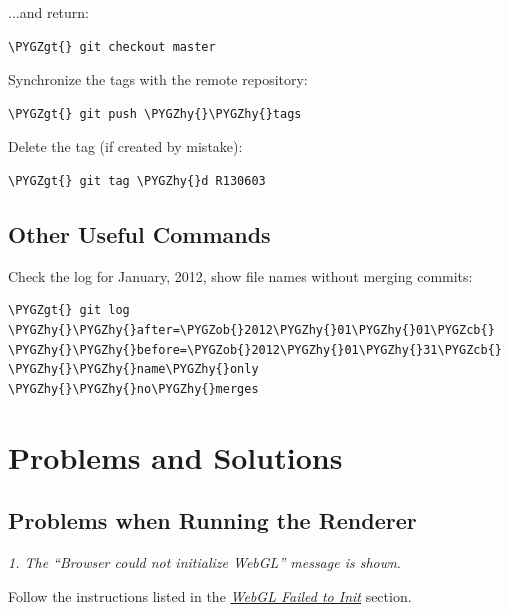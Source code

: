 \documentclass[a4paper,12pt,oneside]{sphinxmanual}
\def\PYGZob{\char`\{}
\def\PYGZcb{\char`\}}
\def\PYGZgt{\char`\>}
\def\PYGZhy{\char`\-}
\begin{document}
...and return:

\begin{Verbatim}[commandchars=\\\{\}]
\PYGZgt{} git checkout master
\end{Verbatim}

Synchronize the tags with the remote repository:

\begin{Verbatim}[commandchars=\\\{\}]
\PYGZgt{} git push \PYGZhy{}\PYGZhy{}tags
\end{Verbatim}

Delete the tag (if created by mistake):

\begin{Verbatim}[commandchars=\\\{\}]
\PYGZgt{} git tag \PYGZhy{}d R130603
\end{Verbatim}


\section{Other Useful Commands}
\label{git_short_manual:id23}
Check the log for January, 2012, show file names without merging commits:

\begin{Verbatim}[commandchars=\\\{\}]
\PYGZgt{} git log \PYGZhy{}\PYGZhy{}after=\PYGZob{}2012\PYGZhy{}01\PYGZhy{}01\PYGZcb{} \PYGZhy{}\PYGZhy{}before=\PYGZob{}2012\PYGZhy{}01\PYGZhy{}31\PYGZcb{} \PYGZhy{}\PYGZhy{}name\PYGZhy{}only \PYGZhy{}\PYGZhy{}no\PYGZhy{}merges
\end{Verbatim}


\chapter{Problems and Solutions}
\label{problems_and_solutions:problems-and-solutions}\label{problems_and_solutions::doc}\label{problems_and_solutions:id1}

\section{Problems when Running the Renderer}
\label{problems_and_solutions:id2}\label{problems_and_solutions:renderer-not-working}
\emph{1. The ``Browser could not initialize WebGL'' message is shown}.

Follow the instructions listed in the {\hyperref[problems_and_solutions:webgl-not-working]{\emph{WebGL Failed to Init}}} section.
\end{document}
